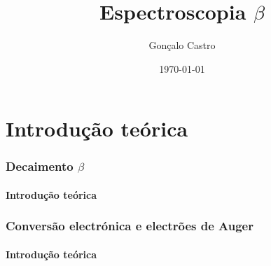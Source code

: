 \documentclass{beamer}
\title[LFAOFR]{Espectroscopia $\beta$}
\author{Gonçalo Castro}
\institute{IST}
\date{\today}
\begin{document}
\begin{frame}
\titlepage
\end{frame}

\section{Introdução teórica}

\begin{frame}\frametitle{Decaimento $\beta$}\framesubtitle{Introdução teórica}



\end{frame}

\begin{frame}\frametitle{Conversão electrónica e electrões de Auger}\framesubtitle{Introdução teórica}



\end{frame}

\end{document}
